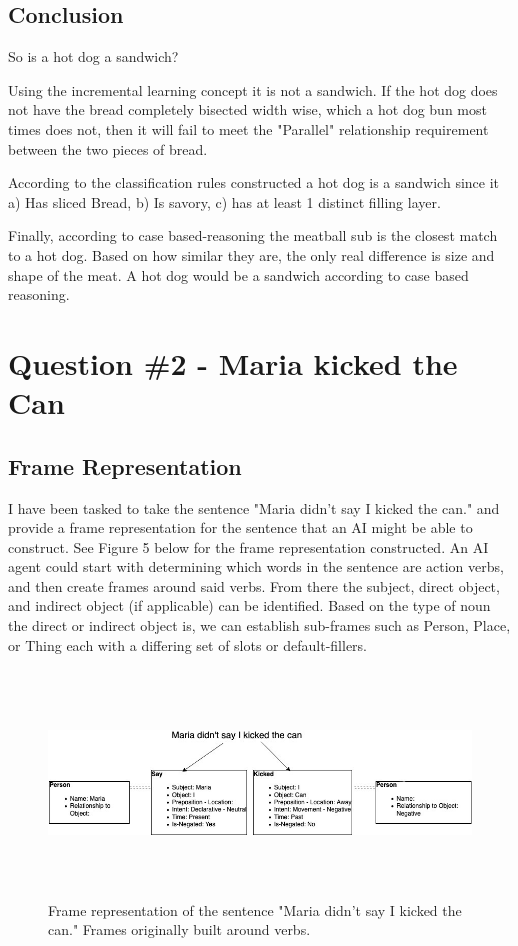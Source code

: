 \documentclass[
	letterpaper, %
]{jdf}
\begin{document}
\subsection{Conclusion}
So is a hot dog a sandwich? 

Using the incremental learning concept it is not a sandwich. If the hot dog does not have the bread completely bisected width wise, which a hot dog bun most times does not, then it will fail to meet the "Parallel" relationship requirement between the two pieces of bread.

According to the classification rules constructed a hot dog is a sandwich since it a) Has sliced Bread, b) Is savory, c) has at least 1 distinct filling layer.

Finally, according to case based-reasoning the meatball sub is the closest match to a hot dog. Based on how similar they are, the only real difference is size and shape of the meat. A hot dog would be a sandwich according to case based reasoning.
\section{Question \#2 - Maria kicked the Can}
\subsection{Frame Representation}
I have been tasked to take the sentence "Maria didn't say I kicked the can." and provide a frame representation for the sentence that an AI might be able to construct. See Figure 5 below for the frame representation constructed. An AI agent could start with determining which words in the sentence are action verbs, and then create frames around said verbs. From there the subject, direct object, and indirect object (if applicable) can be identified. Based on the type of noun the direct or indirect object is, we can establish sub-frames such as Person, Place, or Thing each with a differing set of slots or default-fillers. 
\setcounter{figure}{4}
\begin{figure}[h]
	\centering
	\includegraphics[height=6cm]{Original Maria.jpg}
	\caption{Frame representation of the sentence "Maria didn't say I kicked the can." Frames originally built around verbs.}
	\label{fig:flowchart}
\end{figure}
\end{document}
